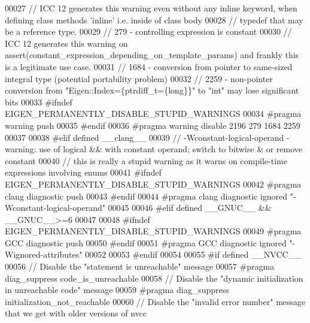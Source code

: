 \begin{DoxyCode}
00027   \textcolor{comment}{//        ICC 12 generates this warning even without any inline keyword, when defining class methods
       'inline' i.e. inside of class body}
00028   \textcolor{comment}{//        typedef that may be a reference type.}
00029   \textcolor{comment}{// 279  - controlling expression is constant}
00030   \textcolor{comment}{//        ICC 12 generates this warning on assert(constant\_expression\_depending\_on\_template\_params) and
       frankly this is a legitimate use case.}
00031   \textcolor{comment}{// 1684 - conversion from pointer to same-sized integral type (potential portability problem)}
00032   \textcolor{comment}{// 2259 - non-pointer conversion from "Eigen::Index=\{ptrdiff\_t=\{long\}\}" to "int" may lose significant
       bits}
00033 \textcolor{preprocessor}{  #ifndef EIGEN\_PERMANENTLY\_DISABLE\_STUPID\_WARNINGS}
00034 \textcolor{preprocessor}{    #pragma warning push}
00035 \textcolor{preprocessor}{  #endif}
00036 \textcolor{preprocessor}{  #pragma warning disable 2196 279 1684 2259}
00037 
00038 \textcolor{preprocessor}{#elif defined \_\_clang\_\_}
00039   \textcolor{comment}{// -Wconstant-logical-operand - warning: use of logical && with constant operand; switch to bitwise & or
       remove constant}
00040   \textcolor{comment}{//     this is really a stupid warning as it warns on compile-time expressions involving enums}
00041 \textcolor{preprocessor}{  #ifndef EIGEN\_PERMANENTLY\_DISABLE\_STUPID\_WARNINGS}
00042 \textcolor{preprocessor}{    #pragma clang diagnostic push}
00043 \textcolor{preprocessor}{  #endif}
00044 \textcolor{preprocessor}{  #pragma clang diagnostic ignored "-Wconstant-logical-operand"}
00045 
00046 \textcolor{preprocessor}{#elif defined \_\_GNUC\_\_ && \_\_GNUC\_\_>=6}
00047 
00048 \textcolor{preprocessor}{  #ifndef EIGEN\_PERMANENTLY\_DISABLE\_STUPID\_WARNINGS}
00049 \textcolor{preprocessor}{    #pragma GCC diagnostic push}
00050 \textcolor{preprocessor}{  #endif}
00051 \textcolor{preprocessor}{  #pragma GCC diagnostic ignored "-Wignored-attributes"}
00052 
00053 \textcolor{preprocessor}{#endif}
00054 
00055 \textcolor{preprocessor}{#if defined \_\_NVCC\_\_}
00056   \textcolor{comment}{// Disable the "statement is unreachable" message}
00057 \textcolor{preprocessor}{  #pragma diag\_suppress code\_is\_unreachable}
00058   \textcolor{comment}{// Disable the "dynamic initialization in unreachable code" message}
00059 \textcolor{preprocessor}{  #pragma diag\_suppress initialization\_not\_reachable}
00060   \textcolor{comment}{// Disable the "invalid error number" message that we get with older versions of nvcc}

\end{DoxyCode}
